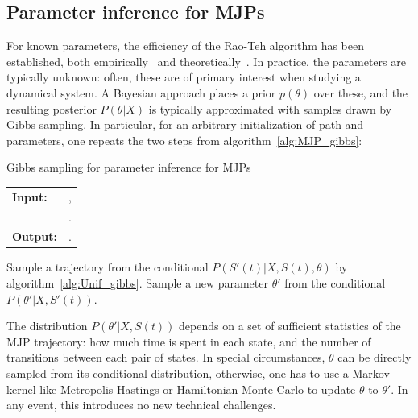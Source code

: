 \subsection{Parameter inference for MJPs}
For known parameters, the efficiency of the Rao-Teh algorithm has been 
established, both empirically~\cite{RaoTeh13} and theoretically~\cite{miasojedow2017}.
In practice, the parameters are typically unknown: often,
these are of primary interest when studying a dynamical
system. A Bayesian approach
places a prior $p(\theta)$ over these, and the
resulting posterior $P(\theta|X)$ is typically approximated
with samples drawn by Gibbs sampling. In particular, for an arbitrary 
initialization of path and  parameters, one repeats the
two steps from algorithm~\ref{alg:MJP_gibbs}:
\begin{algorithm}[H]
  \caption{Gibbs sampling for parameter inference for MJPs}
   \label{alg:MJP_gibbs}
  \begin{tabular}{l l}
   \textbf{Input:  } & \text{A set of partial and noisy observations $X$}, \\
                      & \text{The previous MJP path $S(t) = (S, T)$, the previous MJP parameters $\theta$}.\\ 
   \textbf{Output:  }& \text{A new MJP trajectory $S' (t) = (S', T')$, 
                            new MJP parameters $\theta'$}.\\
   \hline
   \end{tabular}
   \begin{algorithmic}[1]
  \State  Sample a trajectory from the conditional 
  $P(S'(t)|X,S(t),\theta)$ by 
  algorithm~\ref{alg:Unif_gibbs}.
  \State Sample a new parameter $\theta'$ from the conditional 
    $P(\theta'|X,S'(t))$.
   \end{algorithmic}
\end{algorithm} 
\vspace{-.1in}
The distribution $P(\theta'|X,S(t))$ depends on a set of sufficient statistics of the 
MJP trajectory: how
much time is spent in each state, and the number of transitions
between each pair of states. 
In special circumstances, $\theta$ can be directly sampled from its 
conditional distribution, otherwise, one has to use a Markov kernel like
Metropolis-Hastings or Hamiltonian Monte Carlo to update $\theta$ to 
$\theta'$. In any event, this introduces no new technical challenges.
